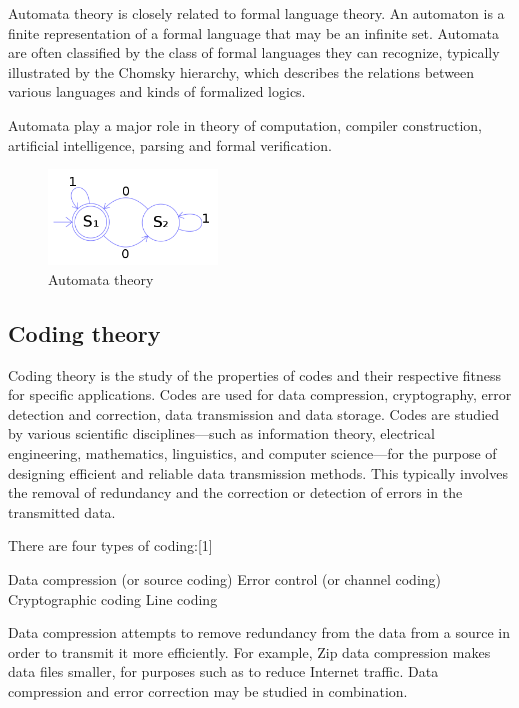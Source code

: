 \documentclass{article}
\begin{document}
Automata theory is closely related to formal language theory. An automaton is a finite representation of a formal language that may be an infinite set. Automata are often classified by the class of formal languages they can recognize, typically illustrated by the Chomsky hierarchy, which describes the relations between various languages and kinds of formalized logics.

Automata play a major role in theory of computation, compiler construction, artificial intelligence, parsing and formal verification.
\begin{figure}[h]
\includegraphics[width=0.4\textwidth]{sj.png}
\caption{Automata theory}
\end{figure}
\subsection{Coding theory} 
Coding theory is the study of the properties of codes and their respective fitness for specific applications. Codes are used for data compression, cryptography, error detection and correction, data transmission and data storage. Codes are studied by various scientific disciplines—such as information theory, electrical engineering, mathematics, linguistics, and computer science—for the purpose of designing efficient and reliable data transmission methods. This typically involves the removal of redundancy and the correction or detection of errors in the transmitted data.

There are four types of coding:[1]

    Data compression (or source coding)
    Error control (or channel coding)
    Cryptographic coding
    Line coding

Data compression attempts to remove redundancy from the data from a source in order to transmit it more efficiently. For example, Zip data compression makes data files smaller, for purposes such as to reduce Internet traffic. Data compression and error correction may be studied in combination.
\end{document}
